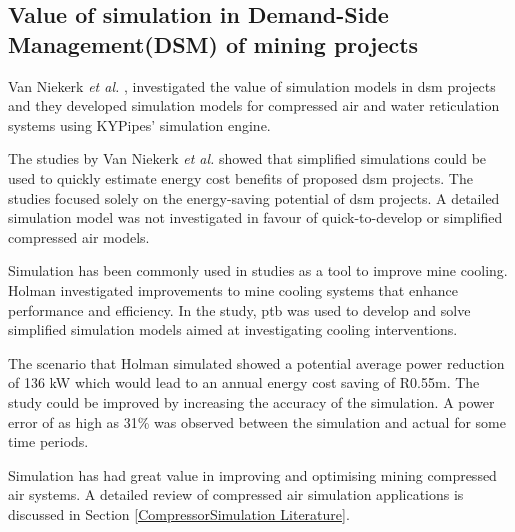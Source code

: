 	\subsection{Value of simulation in Demand-Side Management(DSM) of mining projects}
	Van Niekerk \textit{et al.} \cite{van2013value}, \cite{vanNiekerk2012Value} investigated the value of simulation models in \gls{dsm} projects and they developed simulation models for compressed air and water reticulation systems using KYPipes' simulation engine. 
	\par 
	The studies by Van Niekerk \textit{et al.} showed that simplified simulations could be used to quickly estimate energy cost benefits of proposed \gls{dsm} projects. The studies focused solely on the energy-saving potential of \gls{dsm} projects. A detailed simulation model was not investigated in favour of quick-to-develop or simplified compressed air models.
	\par
	Simulation has been commonly used in studies as a tool to improve mine cooling. Holman \cite{Holman2014Masters} investigated improvements to mine cooling systems that enhance performance and efficiency. In the study, \gls{ptb} was used to develop and solve simplified simulation models aimed at investigating cooling interventions.
	\par 
	The scenario that Holman simulated showed a potential average power reduction of 136 kW which would lead to an annual energy cost saving of R0.55m. The study could be improved by increasing the accuracy of the simulation. A power error of as high as 31\% was observed between the simulation and actual for some time periods.
	\par
	Simulation has had great value in improving and optimising mining compressed air systems. A detailed review of compressed air simulation applications is discussed in Section \ref{CompressorSimulation Literature}.
